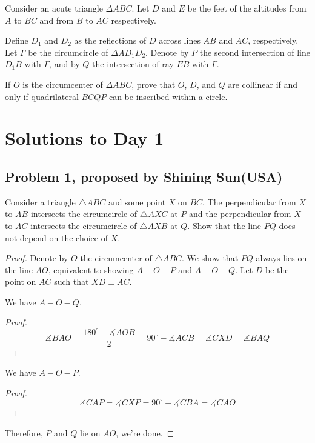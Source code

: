 \documentclass[11pt]{scrartcl}
\begin{document}
\begin{problem}
    Consider an acute triangle $\Delta ABC$. Let $D$ and $E$ be the feet of the altitudes from $A$ to $BC$ and from $B$ to $AC$ respectively.

    Define $D_1$ and $D_2$ as the reflections of $D$ across lines $AB$ and $AC$, respectively. Let $\Gamma$ be the circumcircle of $\Delta AD_1D_2$. 
    Denote by $P$ the second intersection of line $D_1B$ with $\Gamma$, and by $Q$ the intersection of ray $EB$ with $\Gamma$.

    If $O$ is the circumcenter of $\Delta ABC$, prove that $O$, $D$, and $Q$ are collinear if and only if quadrilateral $BCQP$ can be inscribed 
    within a circle.
\end{problem}

\newpage

\section{Solutions to Day 1}

\subsection{Problem 1, proposed by Shining Sun(USA)}

\begin{problem}
    Consider a triangle $\triangle ABC$ and some point $X$ on $BC$. The perpendicular from
    $X$ to $AB$ intersects the circumcircle of $\triangle AXC$ at $P$ and the perpendicular
    from $X$ to $AC$ intersects the circumcircle of $\triangle AXB$ at $Q$. Show that the
    line $PQ$ does not depend on the choice of $X$.
\end{problem}

\begin{proof}
    Denote by $O$ the circumcenter of $\triangle ABC$. We show that $PQ$ always lies on the line $AO$, equivalent to showing
    $A-O-P$ and $A-O-Q$. Let $D$ be the point on $AC$ such that $XD \perp AC$.
    \begin{claim}
        We have $A-O-Q$.
        \begin{proof}
            \[
            \measuredangle BAO = \frac{180^\circ - \measuredangle AOB}{2} = 90^\circ - \measuredangle ACB = \measuredangle CXD 
            = \measuredangle BAQ
            \]
        \end{proof}
    \end{claim}

    \begin{claim}
        We have $A-O-P$.
        \begin{proof}
            \[
            \measuredangle CAP = \measuredangle CXP = 90^\circ + \measuredangle CBA = \measuredangle CAO
            \]
        \end{proof}
    \end{claim}
    Therefore, $P$ and $Q$ lie on $AO$, we're done.
\end{proof}
\end{document}
